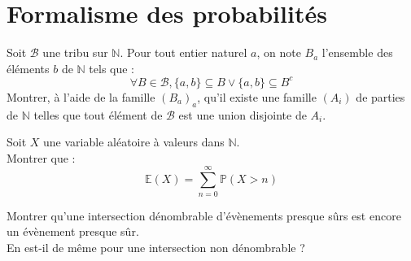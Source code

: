 \section{Formalisme des probabilit\'es}

\begin{exer}
Soit $\mathcal{B}$ une tribu sur $\mathbb{N}$. Pour tout entier naturel $a$, on note $B_a$ l'ensemble des \'el\'ements $b$ de $\mathbb{N}$ tels que :
\[\forall B \in \mathcal{B} , \{a,b\}\subseteq B \vee \{a,b\}\subseteq B^c\]
Montrer, \`a l'aide de la famille $(B_a)_a$, qu'il existe une famille $(A_i)$ de parties de $\mathbb{N}$ telles que tout \'el\'ement de $\mathcal{B}$ est une union disjointe de $A_i$.
\end{exer}

\begin{exer}
Soit $X$ une variable al\'eatoire \`a valeurs dans $\mathbb{N}$.\\
Montrer que : \[\mathbb{E}(X)=\sum\limits_{n=0}^{\infty} \mathbb{P}(X>n)\]
\end{exer}

\begin{exer}
Montrer qu'une intersection d\'enombrable d'\'ev\`enements presque s\^urs est encore un \'ev\`enement presque s\^ur.\\
En est-il de même pour une intersection non d\'enombrable ?
\end{exer}